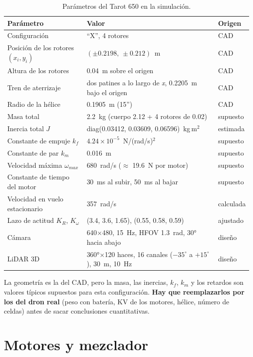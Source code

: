 \begin{table}[H]
\centering\small
\begin{tabular}{lll}
\toprule
\textbf{Parámetro} & \textbf{Valor} & \textbf{Origen} \\ \midrule
Configuración & ``X'', 4 rotores & CAD \\
Posición de los rotores $(x_i, y_i)$ & $(\pm0.2198,\ \pm0.212)$~m & CAD \\
Altura de los rotores & 0.04~m sobre el origen & CAD \\
Tren de aterrizaje & dos patines a lo largo de \emph{x}, 0.2205~m bajo el origen & CAD \\
Radio de la hélice & 0.1905~m (15'') & CAD \\
Masa total & 2.2~kg (cuerpo 2.12 + 4 rotores de 0.02) & supuesto \\
Inercia total $J$ & diag(0.03412, 0.03609, 0.06596)~kg\,m$^2$ & estimada \\
Constante de empuje $k_f$ & $4.24\times10^{-5}$~N/(rad/s)$^2$ & supuesto \\
Constante de par $k_m$ & 0.016~m & supuesto \\
Velocidad máxima $\omega_{max}$ & 680~rad/s ($\approx$ 19.6~N por motor) & supuesto \\
Constante de tiempo del motor & 30~ms al subir, 50~ms al bajar & supuesto \\
Velocidad en vuelo estacionario & 357~rad/s & calculada \\
Lazo de actitud $K_R$, $K_\omega$ & (3.4, 3.6, 1.65), (0.55, 0.58, 0.59) & ajustado \\
Cámara & 640$\times$480, 15~Hz, HFOV 1.3~rad, 30° hacia abajo & diseño \\
LiDAR 3D & 360°$\times$120 haces, 16 canales ($-35^\circ$ a $+15^\circ$), 30~m, 10~Hz & diseño \\
\bottomrule
\end{tabular}
\caption{Parámetros del Tarot 650 en la simulación.}
\label{tab:tarot}
\end{table}

\begin{aviso}
La geometría es la del CAD, pero la masa, las inercias, $k_f$, $k_m$ y los retardos son valores
típicos supuestos para esta configuración. \textbf{Hay que reemplazarlos por los del dron real}
(peso con batería, KV de los motores, hélice, número de celdas) antes de sacar conclusiones
cuantitativas.
\end{aviso}

\section{Motores y mezclador}

